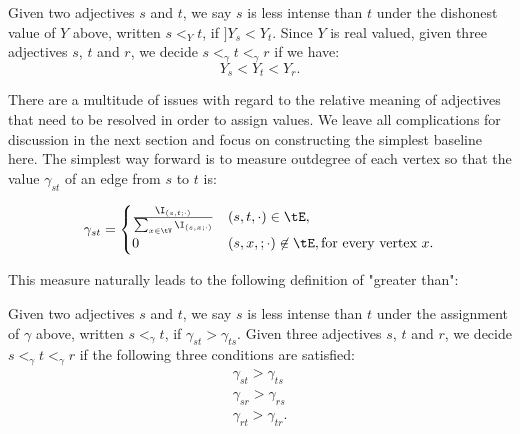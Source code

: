 \theoremstyle{definition}
\begin{definition}
Given two adjectives $s$ and $t$, we say $s$ is less intense than $t$ under the dishonest value of $Y$ above, written $s <_{Y} t$, if $]Y_s < Y_t$. Since $Y$ is real valued, given three adjectives $s$, $t$ and $r$, we decide $s <_{\gamma} t <_{\gamma} r$ if we have:
	\[
		Y_s < Y_t < Y_r.
	\]
\end{definition}
















There are a multitude of issues with regard to the relative meaning of adjectives that need to be resolved in order to assign values. We leave all complications for discussion in the next section and focus on constructing the simplest baseline here. The simplest way forward is to measure outdegree of each vertex so that the value $\gamma_{st}$ of an edge from $s$ to $t$ is:

\begin{equation}
\gamma_{st} = \begin{cases} 
	\frac{\I_{(s,t; \cdot)}}{\sum_{x \in \tV} \I_{(s,x; \cdot)}} & (s,t,\cdot) \in \tE, \\ 
	                                             0 & (s,x,;\cdot)\not\in \tE, \text{for every vertex } x.
\end{cases}
\end{equation}

This measure naturally leads to the following definition of "greater than":

\theoremstyle{definition}
\begin{definition}
Given two adjectives $s$ and $t$, we say $s$ is less intense than $t$ under the assignment of $\gamma$ above, written $s <_{\gamma} t$, if $\gamma_{st} > \gamma_{ts}$. Given three adjectives $s$, $t$ and $r$, we decide $s <_{\gamma} t <_{\gamma} r$ if the following three conditions are satisfied:
	\begin{align*}
		\gamma_{st} > \gamma_{ts} \\
		\gamma_{sr} > \gamma_{rs} \\
		\gamma_{rt} > \gamma_{tr}.
	\end{align*}
\end{definition}

